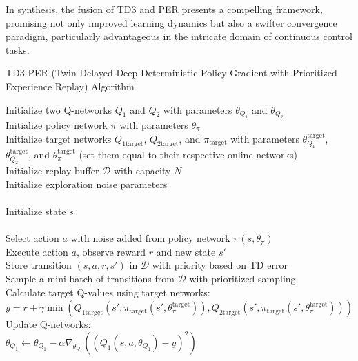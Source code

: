 \documentclass[preprint,12pt]{elsarticle}
\begin{document}
In synthesis, the fusion of TD3 and PER presents a compelling framework, promising not only improved learning dynamics but also a swifter convergence paradigm, particularly advantageous in the intricate domain of continuous control tasks.\\

\begin{algorithm}[!htbp]
\caption{TD3-PER (Twin Delayed Deep Deterministic Policy Gradient with Prioritized Experience Replay) Algorithm}
\begin{algorithmic}
    \STATE Initialize two Q-networks $Q_1$ and $Q_2$ with parameters $\theta_{Q_1}$ and $\theta_{Q_2}$\\
    \STATE Initialize policy network $\pi$ with parameters $\theta_\pi$\\
    \STATE Initialize target networks $Q_{1\text{target}}$, $Q_{2\text{target}}$, and $\pi_{\text{target}}$ with parameters $\theta_{Q_1}^{\text{target}}$,\\ $\theta_{Q_2}^{\text{target}}$, and $\theta_\pi^{\text{target}}$ (set them equal to their respective online networks)\\
    \STATE Initialize replay buffer $\mathcal{D}$ with capacity $N$\\
    \STATE Initialize exploration noise parameters\\
    \\
        \STATE Initialize state $s$\\
        \\
            \STATE Select action $a$ with noise added from policy network $\pi(s, \theta_\pi)$\\
            \STATE Execute action $a$, observe reward $r$ and new state $s'$\\
            \STATE Store transition $(s, a, r, s')$ in $\mathcal{D}$ with priority based on TD error\\
            \STATE Sample a mini-batch of transitions from $\mathcal{D}$ with prioritized sampling\\
            \STATE Calculate target Q-values using target networks:\\
            \STATE \quad $y = r + \gamma \min(Q_{1\text{target}}(s', \pi_{\text{target}}(s', \theta_\pi^{\text{target}})), Q_{2\text{target}}(s', \pi_{\text{target}}(s', \theta_\pi^{\text{target}})))$\\
            \STATE Update Q-networks:\\
            \STATE \quad $\theta_{Q_1} \leftarrow \theta_{Q_1} - \alpha \nabla_{\theta_{Q_1}} \left((Q_1(s, a, \theta_{Q_1}) - y)^2\right)$\\

\end{algorithmic}
\end{algorithm}
\end{document}
